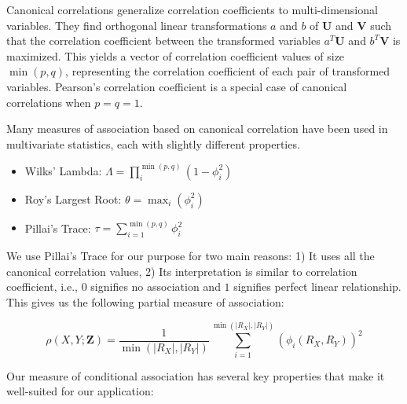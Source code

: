 \documentclass{uai2025} %
\begin{document}
Canonical correlations generalize correlation coefficients to multi-dimensional
variables. They find orthogonal linear transformations $ a $ and $ b $ of $
\bm{U} $ and $ \bm{V} $ such that the correlation coefficient between the
transformed variables $ a^T \bm{U} $ and $ b^T \bm{V} $ is maximized. This
yields a vector of correlation coefficient values of size $ \min(p, q) $,
representing the correlation coefficient of each pair of transformed variables.
Pearson's correlation coefficient is a special case of canonical correlations
when $ p = q = 1 $.

Many measures of association based on canonical correlation have been used in
multivariate statistics, each with slightly different properties.
\begin{itemize}
	\item Wilks' Lambda: $\Lambda = \prod_{i}^{\min(p, q)} (1 - \phi_i^2) $
	\item Roy's Largest Root: $ \theta = \max_i(\phi_i^2) $
	\item Pillai's Trace: $ \tau = \sum_{i=1}^{\min(p, q)} \phi_i^2 $
\end{itemize}

We use Pillai's Trace for our purpose for two main reasons: 1) It uses all the
canonical correlation values, 2) Its interpretation is similar to correlation
coefficient, i.e., $ 0 $ signifies no association and $ 1 $ signifies perfect
linear relationship. This gives us the following partial measure of
association:

\begin{equation}
	\rho(X, Y; \bm{Z}) = \frac{1}{\min(\rvert R_X \rvert, \rvert R_Y \rvert)}
	\sum_{i=1}^{\min(\rvert R_X \rvert, \rvert R_Y \rvert)} (\phi_i(R_X, R_Y))^2
\end{equation}

Our measure of conditional association has several key properties that make it
well-suited for our application:
\end{document}
